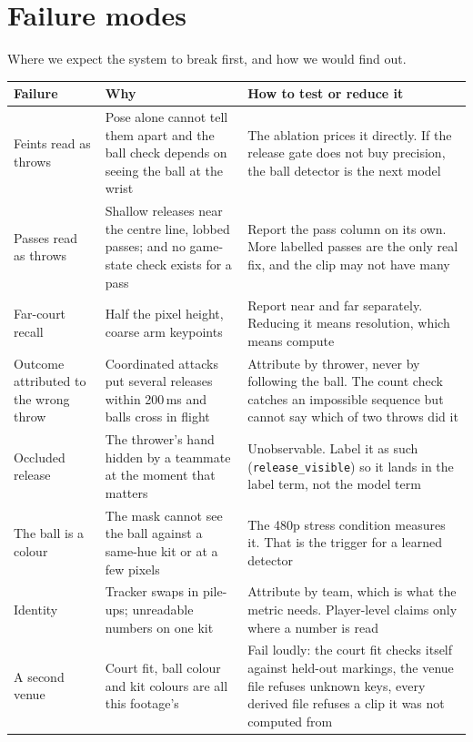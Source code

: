 \documentclass[10pt,a4paper]{article}
\begin{document}
\section{Failure modes}
\label{sec:failure}

Where we expect the system to break first, and how we would find out.

{\footnotesize
\begin{xltabular}{\textwidth}{L{30mm} L{62mm} X}
\toprule
\textbf{Failure} & \textbf{Why} & \textbf{How to test or reduce it}\\
\midrule
Feints read as throws & Pose alone cannot tell them apart and the ball check depends on seeing the ball at the wrist & The ablation prices it directly. If the release gate does not buy precision, the ball detector is the next model\\
Passes read as throws & Shallow releases near the centre line, lobbed passes; and no game-state check exists for a pass & Report the pass column on its own. More labelled passes are the only real fix, and the clip may not have many\\
Far-court recall & Half the pixel height, coarse arm keypoints & Report near and far separately. Reducing it means resolution, which means compute\\
Outcome attributed to the wrong throw & Coordinated attacks put several releases within 200\,ms and balls cross in flight & Attribute by thrower, never by following the ball. The count check catches an impossible sequence but cannot say which of two throws did it\\
Occluded release & The thrower's hand hidden by a teammate at the moment that matters & Unobservable. Label it as such (\texttt{release\_visible}) so it lands in the label term, not the model term\\
The ball is a colour & The mask cannot see the ball against a same-hue kit or at a few pixels & The 480p stress condition measures it. That is the trigger for a learned detector\\
Identity & Tracker swaps in pile-ups; unreadable numbers on one kit & Attribute by team, which is what the metric needs. Player-level claims only where a number is read\\
A second venue & Court fit, ball colour and kit colours are all this footage's & Fail loudly: the court fit checks itself against held-out markings, the venue file refuses unknown keys, every derived file refuses a clip it was not computed from\\
\bottomrule
\end{xltabular}}
\end{document}
